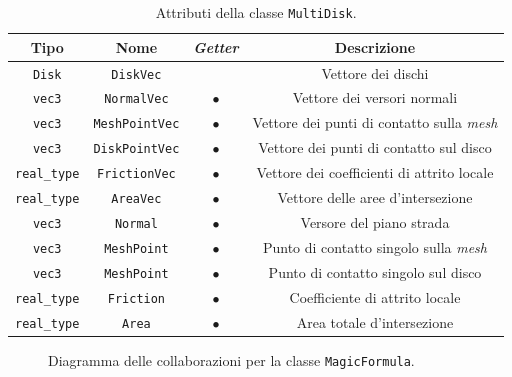 \begin{table}[h!]
	\centering
	\begin{tabular}{|c|c|c|c|}
		\hline 
		\textbf{Tipo} & \textbf{Nome} & \textit{\textbf{Getter}} & \textbf{Descrizione} \\ \hline 
		\texttt{Disk} & \texttt{DiskVec} &  & Vettore dei dischi \\ \hline 
		\texttt{vec3} & \texttt{NormalVec} & $\bullet$ & Vettore dei versori normali \\ \hline
		\texttt{vec3} & \texttt{MeshPointVec} & $\bullet$ & Vettore dei punti di contatto sulla \textit{mesh} \\ \hline
		\texttt{vec3} & \texttt{DiskPointVec} & $\bullet$ & Vettore dei punti di contatto sul disco \\ \hline
		\texttt{real\_type} & \texttt{FrictionVec} & $\bullet$ & Vettore dei coefficienti di attrito locale \\ \hline
		\texttt{real\_type} & \texttt{AreaVec} & $\bullet$ & Vettore delle aree d'intersezione \\ \hline
		\texttt{vec3} & \texttt{Normal} & $\bullet$ & Versore del piano strada \\ \hline
		\texttt{vec3} & \texttt{MeshPoint} & $\bullet$ & Punto di contatto singolo sulla \textit{mesh} \\ \hline
		\texttt{vec3} & \texttt{MeshPoint} & $\bullet$ & Punto di contatto singolo sul disco \\ \hline
		\texttt{real\_type} & \texttt{Friction} & $\bullet$ & Coefficiente di attrito locale \\ \hline
		\texttt{real\_type} & \texttt{Area} & $\bullet$ & Area totale d'intersezione \\ \hline
	\end{tabular}
	\caption{Attributi della classe \texttt{MultiDisk}.}
	\label{}
\end{table}
%
\begin{figure}
	\centering
	\caption{Diagramma delle collaborazioni per la classe \texttt{MagicFormula}.}
\end{figure}
